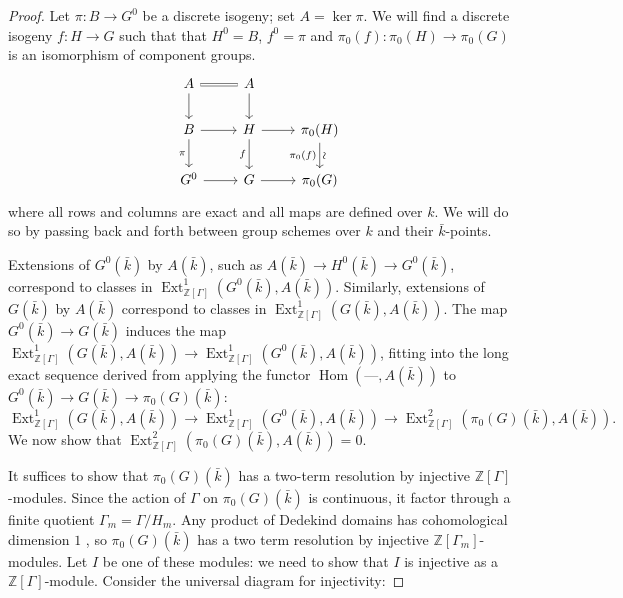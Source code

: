 \documentclass[11pt]{amsart}
\theoremstyle{plain}
\theoremstyle{definition}
\theoremstyle{remark}
\newcommand{\ZZ}{{\mathbb{Z}}}
\newcommand{\bFq}{\bar{k}}
\newcommand{\Fq}{k}
\DeclareMathOperator{\Hom}{Hom}
\DeclareMathOperator{\Ext}{Ext}
\newcommand\David[1]{\marginpar{\smaller\smaller DR: #1}}
\begin{document}
\begin{proof}
Let $\pi: B \to G^0$ be a discrete isogeny; set $A = \ker \pi$.
  We will find a discrete isogeny $f: H\to G$
  such that that $H^0 = B$, $f^0 =\pi$ and
  $\pi_0(f) : \pi_0(H)\to \pi_0(G)$ is an isomorphism of component
  groups.
  \begin{equation}\label{extension-diagram}
  \begin{tikzcd}
  A \arrow[equal]{r} \dar & A \dar \\
  B \rar \dar[swap]{\pi} & H \rar \dar[swap]{f} & \pi_0(H) \arrow{d}[below,rotate=90]{\sim}[swap]{\pi_0(f)} \\
  G^0 \rar & G \rar & \pi_0(G)
  \end{tikzcd}
  \end{equation}
  where all rows and columns are exact and all maps are defined over
  $\Fq$.  We will do so by passing back and forth between group
  schemes over $\Fq$ and their $\bFq$-points.  
  
  Extensions of
  $G^0(\bFq)$ by $A(\bFq)$, such as $A(\bFq) \to H^0(\bFq) \to G^0(\bFq)$,
  correspond to classes in $\Ext^1_{\ZZ[\Gamma]}(G^0(\bFq), A(\bFq))$.
  Similarly, extensions of $G(\bFq)$ by $A(\bFq)$ correspond to
  classes in $\Ext^1_{\ZZ[\Gamma]}(G(\bFq), A(\bFq))$.  The map
  $G^0(\bFq) \to G(\bFq)$ induces the map
  $\Ext^1_{\ZZ[\Gamma]}(G(\bFq), A(\bFq)) \to \Ext^1_{\ZZ[\Gamma]}(G^0(\bFq), A(\bFq))$,
  fitting into the long exact sequence derived from applying
  the functor $\Hom(\mbox{---}, A(\bFq))$ to $G^0(\bFq) \to G(\bFq) \to \pi_0(G)(\bFq)$:
  \[
  \Ext^1_{\ZZ[\Gamma]}(G(\bFq), A(\bFq)) \to \Ext^1_{\ZZ[\Gamma]}(G^0(\bFq), A(\bFq)) \to \Ext^2_{\ZZ[\Gamma]}(\pi_0(G)(\bFq), A(\bFq)).
  \]
  We now show that $\Ext^2_{\ZZ[\Gamma]}(\pi_0(G)(\bFq), A(\bFq)) = 0$.

  It suffices to show that $\pi_0(G)(\bFq)$ has a two-term resolution
  by injective $\ZZ[\Gamma]$-modules.  Since the action of $\Gamma$ on
  $\pi_0(G)(\bFq)$ is continuous, it factor through a finite quotient
  $\Gamma_m = \Gamma / H_m$.  Any product of Dedekind domains has
  cohomological dimension $1$ \David{Add a citation for this fact}, so $\pi_0(G)(\bFq)$ has a
  two term resolution by injective $\ZZ[\Gamma_m]$-modules.  Let $I$
  be one of these modules: we need to show that $I$ is injective as a
  $\ZZ[\Gamma]$-module.  Consider the universal diagram for injectivity:
  

\end{proof}
\end{document}
